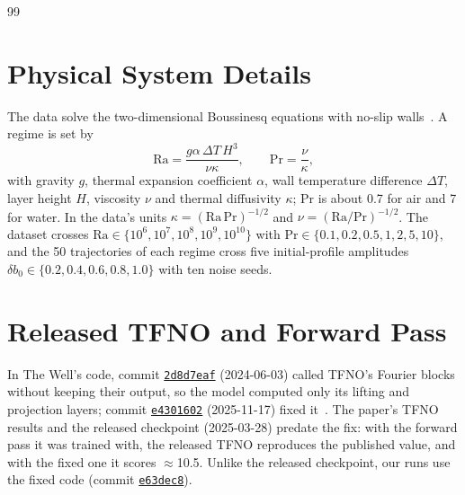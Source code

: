 \documentclass[11pt]{article}
\providecommand{\appendixcontents}{}
\begin{document}
\begin{thebibliography}{99}

\end{thebibliography}

\clearpage
\appendix
\addtocontents{toc}{\protect\appendixcontents}
\makeatletter
\renewcommand{\@seccntformat}[1]{\ifcsname prefix@#1\endcsname\csname prefix@#1\endcsname\fi
  \csname the#1\endcsname\ifcsname prefix@#1\endcsname:\fi\quad}
\newcommand{\prefix@section}{Appendix~}
\makeatother

\section{Physical System Details}
\label{app:rb_regimes}

The data solve the two-dimensional Boussinesq equations with no-slip walls~\cite{wellrb}. A regime is set by
\begin{equation}
    \mathrm{Ra} = \frac{g\alpha\,\Delta T\,H^3}{\nu\kappa}, \qquad \mathrm{Pr} = \frac{\nu}{\kappa},
\end{equation}
with gravity $g$, thermal expansion coefficient $\alpha$, wall temperature difference $\Delta T$, layer height $H$,
viscosity $\nu$ and thermal diffusivity $\kappa$; $\mathrm{Pr}$ is about 0.7 for air and 7 for water. In the data's
units $\kappa=(\mathrm{Ra}\,\mathrm{Pr})^{-1/2}$ and $\nu=(\mathrm{Ra}/\mathrm{Pr})^{-1/2}$. The dataset crosses
$\mathrm{Ra}\in\{10^6,10^7,10^8,10^9,10^{10}\}$ with $\mathrm{Pr}\in\{0.1,0.2,0.5,1,2,5,10\}$, and the 50
trajectories of each regime cross five initial-profile amplitudes $\delta b_0\in\{0.2,0.4,0.6,0.8,1.0\}$ with ten
noise seeds.

\section{Released TFNO and Forward Pass}
\label{app:tfno}
In The Well's code, commit
\href{https://github.com/PolymathicAI/the_well/commit/2d8d7eaf9eb46b96f215abf39c94b6be4bf9ea5c}{\texttt{2d8d7eaf}}
(2024-06-03) called TFNO's Fourier blocks without keeping their output, so the model computed only its lifting and
projection layers; commit
\href{https://github.com/PolymathicAI/the_well/commit/e4301602e57f2dddeaa87856dda49bbba47c663b}{\texttt{e4301602}}
(2025-11-17) fixed it~\cite{wellfix}. The paper's TFNO results and the released checkpoint (2025-03-28) predate the
fix: with the forward pass it was trained with, the released TFNO reproduces the published value, and with the fixed
one it scores $\approx$10.5. Unlike the released checkpoint, our runs use the fixed code (commit
\href{https://github.com/PolymathicAI/the_well/commit/e63dec8ded515be864755eaf595d39fea409e335}{\texttt{e63dec8}}).
\end{document}
